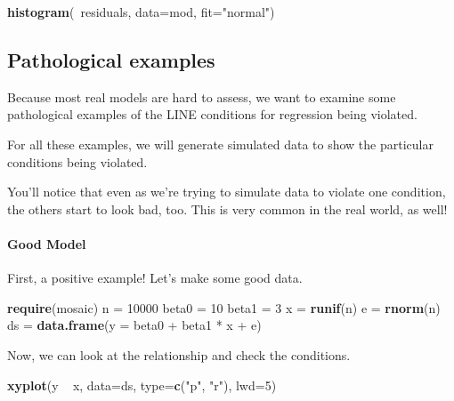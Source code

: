 \documentclass[]{article}
\newenvironment{Shaded}{\begin{snugshade}}{\end{snugshade}}
\newcommand{\KeywordTok}[1]{\textcolor[rgb]{0.13,0.29,0.53}{\textbf{{#1}}}}
\newcommand{\DataTypeTok}[1]{\textcolor[rgb]{0.13,0.29,0.53}{{#1}}}
\newcommand{\DecValTok}[1]{\textcolor[rgb]{0.00,0.00,0.81}{{#1}}}
\newcommand{\StringTok}[1]{\textcolor[rgb]{0.31,0.60,0.02}{{#1}}}
\newcommand{\NormalTok}[1]{{#1}}
\let\oldparagraph\paragraph
\renewcommand{\paragraph}[1]{\oldparagraph{#1}\mbox{}}
\begin{document}
\begin{Shaded}
\begin{Highlighting}[]
\KeywordTok{histogram}\NormalTok{(~residuals, }\DataTypeTok{data=}\NormalTok{mod, }\DataTypeTok{fit=}\StringTok{"normal"}\NormalTok{)}
\end{Highlighting}
\end{Shaded}

\subsection{Pathological examples}\label{pathological-examples}

Because most real models are hard to assess, we want to examine some
pathological examples of the LINE conditions for regression being
violated.

For all these examples, we will generate simulated data to show the
particular conditions being violated.

You'll notice that even as we're trying to simulate data to violate one
condition, the others start to look bad, too. This is very common in the
real world, as well!

\paragraph{Good Model}\label{good-model}

First, a positive example! Let's make some good data.

\begin{Shaded}
\begin{Highlighting}[]
\KeywordTok{require}\NormalTok{(mosaic)}
\NormalTok{n =}\StringTok{ }\DecValTok{10000}
\NormalTok{beta0 =}\StringTok{ }\DecValTok{10}
\NormalTok{beta1 =}\StringTok{ }\DecValTok{3}
\NormalTok{x =}\StringTok{ }\KeywordTok{runif}\NormalTok{(n)}
\NormalTok{e =}\StringTok{ }\KeywordTok{rnorm}\NormalTok{(n)}
\NormalTok{ds =}\StringTok{ }\KeywordTok{data.frame}\NormalTok{(}\DataTypeTok{y =} \NormalTok{beta0 +}\StringTok{ }\NormalTok{beta1 *}\StringTok{ }\NormalTok{x +}\StringTok{ }\NormalTok{e)}
\end{Highlighting}
\end{Shaded}

Now, we can look at the relationship and check the conditions.

\begin{Shaded}
\begin{Highlighting}[]
\KeywordTok{xyplot}\NormalTok{(y ~}\StringTok{ }\NormalTok{x, }\DataTypeTok{data=}\NormalTok{ds, }\DataTypeTok{type=}\KeywordTok{c}\NormalTok{(}\StringTok{"p"}\NormalTok{, }\StringTok{"r"}\NormalTok{), }\DataTypeTok{lwd=}\DecValTok{5}\NormalTok{)}
\end{Highlighting}
\end{Shaded}
\end{document}
